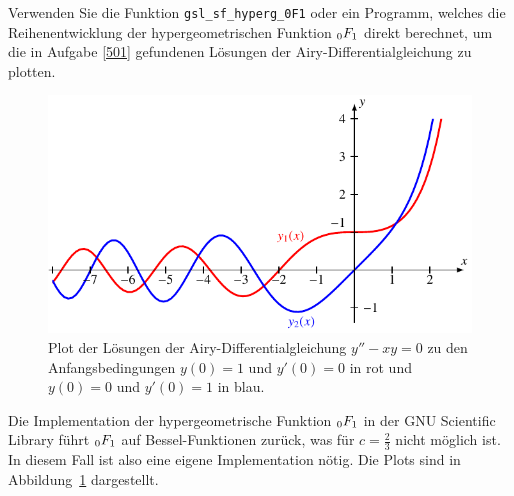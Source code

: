 Verwenden Sie die Funktion \verb+gsl_sf_hyperg_0F1+ oder ein Programm,
welches die Reihenentwicklung der hypergeometrischen Funktion
$\mathstrut_0F_1$ direkt berechnet, um die
in Aufgabe \ref{501} gefundenen Lösungen der Airy-Differentialgleichung
zu plotten.

\begin{figure}
\centering
\includegraphics{chapters/050-differential/uebungsaufgaben/airy.pdf}
\caption{Plot der Lösungen der Airy-Differentialgleichung $y''-xy=0$
zu den Anfangsbedingungen $y(0)=1$ und $y'(0)=0$ in {\color{red}rot}
und $y(0)=0$ und $y'(0)=1$ in {\color{blue}blau}.
\label{buch:differentialgleichunge:uebung:503:plot}}
\end{figure}
\begin{loesung}
Die Implementation der hypergeometrische Funktion $\mathstrut_0F_1$ in der
GNU Scientific Library führt $\mathstrut_0F_1$ auf Bessel-Funktionen
zurück, was für $c=\frac23$ nicht möglich ist. 
In diesem Fall ist also eine eigene Implementation nötig.
Die Plots sind in Abbildung~\ref{buch:differentialgleichunge:uebung:503:plot}
dargestellt.
\end{loesung}
